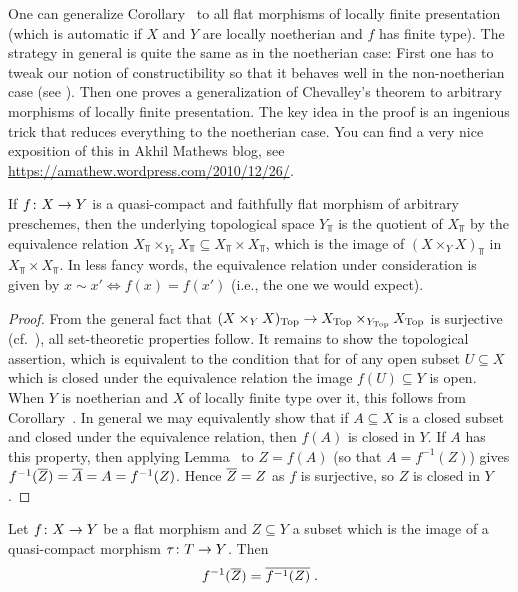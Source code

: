 \documentclass[a4paper,parskip=half,numbers=enddot, DIV=12]{scrreprt}
\begin{document}
\begin{rem}
	One can generalize Corollary~ to all flat morphisms of locally finite presentation (which is automatic if $X$ and $Y$ are locally noetherian and $f$ has finite type). The strategy in general is quite the same as in the noetherian case: First one has to tweak our notion of constructibility so that it behaves well in the non-noetherian case (see \cite[ and  ]{stacks-project}). Then one proves a generalization of Chevalley's theorem to arbitrary morphisms of locally finite presentation. The key idea in the proof is an ingenious trick that reduces everything to the noetherian case. You can find a very nice exposition of this in Akhil Mathews blog, see \url{https://amathew.wordpress.com/2010/12/26/}.
\end{rem}
\begin{prop}
	If $f\colon X\morphism Y$ is a quasi-compact and faithfully flat morphism of arbitrary preschemes, then the underlying topological space $Y_\Top$ is the quotient of $X_\Top$ by the equivalence relation $X_\Top\times_{Y_\Top}X_{\Top}\subseteq X_\Top\times X_\Top$, which is the image of $(X\times_YX)_\Top$ in $X_\Top\times X_\Top$. In less fancy words, the equivalence relation under consideration is given by $x\sim x'\Leftrightarrow f(x)=f(x')$ (i.e., the one we would expect).
\end{prop}
\begin{proof}
	From the general fact that $(X\times_YX)_\Top\morphism X_\Top\times_{Y_\Top}X_\Top$ is surjective (cf.\ \cite[Corollary~1.3.1]{alggeo1}), all set-theoretic properties follow. It remains to show the topological assertion, which is equivalent to the condition that for of any open subset $U\subseteq X$ which is closed under the equivalence relation the image $f(U)\subseteq Y$ is open. When $Y$ is noetherian and $X$ of locally finite type over it, this follows from Corollary~. In general we may equivalently show that if $A\subseteq X$ is a closed subset and closed under the equivalence relation, then $f(A)$ is closed in $Y$. If $A$ has this property, then applying Lemma~ to $Z=f(A)$ (so that $A=f^{-1}(Z)$) gives $f^{-1}(\overline{Z})=\overline{A}=A=f^{-1}(Z)$. Hence $\overline{Z}=Z$ as $f$ is surjective, so $Z$ is closed in $Y$.
\end{proof}
\begin{lem}
	Let $f\colon X\morphism Y$ be a flat morphism and $Z\subseteq Y$ a subset which is the image of a quasi-compact morphism $\tau\colon T\morphism Y$. Then 
	\begin{align*}
		f^{-1}(\overline{Z})=\overline{f^{-1}(Z)}\;.
	\end{align*}
\end{lem}
\end{document}
